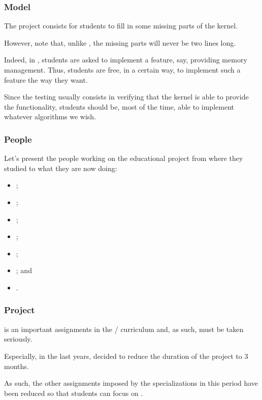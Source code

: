 
\begin{frame}
  \frametitle{Model}

  The project consists for students to fill in some missing parts of the
  kernel.

  \-

  However, note that, unlike , the missing parts will never
  be two lines long.

  \-

  Indeed, in , students are asked to implement a feature, say,
  providing memory management. Thus, students are free, in a certain way,
  to implement such a feature the way they want.

  \-

  Since the testing usually consists in verifying that the kernel is able
  to provide the functionality, students should be, most of the time, able
  to implement whatever algorithms \etc{} we wish.
\end{frame}


\begin{frame}
  \frametitle{People}

  Let's present the people working on the educational project from where they
  studied to what they are now doing:

  \begin{itemize}
    \item
      ;
    \item
      ;
    \item
      ;
    \item
      ;
    \item
      ;
    \item
      ; and
    \item
      .
  \end{itemize}
\end{frame}


\begin{frame}
  \frametitle{Project}

   is an important assignments in the /
  curriculum and, as such, must be taken seriously.

  \-

  Especially, in the last years,  decided to reduce the duration
  of the project to $3$ months.

  \-

  As such, the other assignments imposed by the specializations in this
  period have been reduced so that students can focus on .
\end{frame}

